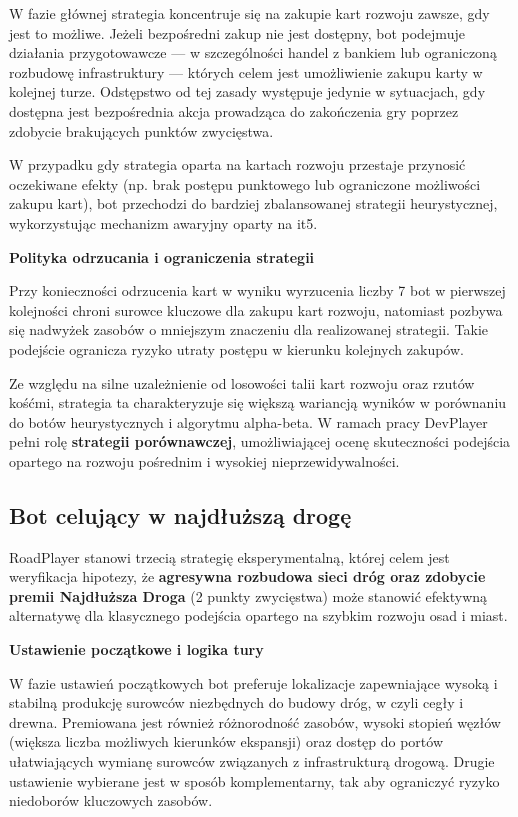 \documentclass[polish,inz,longabstract]{iithesis}
\begin{document}
W fazie głównej strategia koncentruje się na zakupie kart rozwoju zawsze, gdy jest to możliwe. Jeżeli bezpośredni zakup nie jest dostępny, bot podejmuje działania przygotowawcze — w szczególności handel z bankiem lub ograniczoną rozbudowę infrastruktury — których celem jest umożliwienie zakupu karty w kolejnej turze. Odstępstwo od tej zasady występuje jedynie w sytuacjach, gdy dostępna jest bezpośrednia akcja prowadząca do zakończenia gry poprzez zdobycie brakujących punktów zwycięstwa.

W przypadku gdy strategia oparta na kartach rozwoju przestaje przynosić oczekiwane efekty (np. brak postępu punktowego lub ograniczone możliwości zakupu kart), bot przechodzi do bardziej zbalansowanej strategii heurystycznej, wykorzystując mechanizm awaryjny oparty na it5.

\medskip
\textbf{Polityka odrzucania i ograniczenia strategii}

Przy konieczności odrzucenia kart w wyniku wyrzucenia liczby 7 bot w pierwszej kolejności chroni surowce kluczowe dla zakupu kart rozwoju, natomiast pozbywa się nadwyżek zasobów o mniejszym znaczeniu dla realizowanej strategii. Takie podejście ogranicza ryzyko utraty postępu w kierunku kolejnych zakupów.

Ze względu na silne uzależnienie od losowości talii kart rozwoju oraz rzutów kośćmi, strategia ta charakteryzuje się większą wariancją wyników w porównaniu do botów heurystycznych i algorytmu alpha-beta. W ramach pracy DevPlayer pełni rolę \textbf{strategii porównawczej}, umożliwiającej ocenę skuteczności podejścia opartego na rozwoju pośrednim i wysokiej nieprzewidywalności.

\medskip
\subsection{Bot celujący w najdłuższą drogę}
\label{sec:roadplayer}

RoadPlayer stanowi trzecią strategię eksperymentalną, której celem jest weryfikacja hipotezy, że \textbf{agresywna rozbudowa sieci dróg oraz zdobycie premii Najdłuższa Droga} (2 punkty zwycięstwa) może stanowić efektywną alternatywę dla klasycznego podejścia opartego na szybkim rozwoju osad i miast.

\medskip
\textbf{Ustawienie początkowe i logika tury}

W fazie ustawień początkowych bot preferuje lokalizacje zapewniające wysoką i stabilną produkcję surowców niezbędnych do budowy dróg, w czyli cegły i drewna. Premiowana jest również różnorodność zasobów, wysoki stopień węzłów (większa liczba możliwych kierunków ekspansji) oraz dostęp do portów ułatwiających wymianę surowców związanych z infrastrukturą drogową. Drugie ustawienie wybierane jest w sposób komplementarny, tak aby ograniczyć ryzyko niedoborów kluczowych zasobów.
\end{document}
